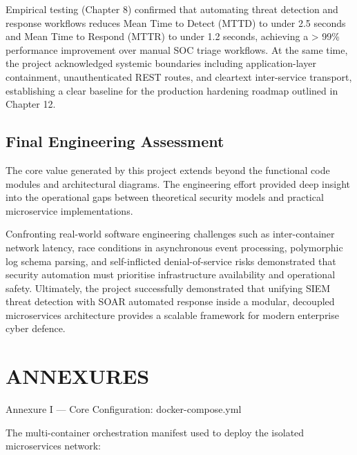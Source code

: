 Empirical testing (Chapter 8) confirmed that automating threat detection and response workflows reduces Mean Time to Detect (MTTD) to under 2.5 seconds and Mean Time to Respond (MTTR) to under 1.2 seconds, achieving a > 99\% performance improvement over manual SOC triage workflows. At the same time, the project acknowledged systemic boundaries including application-layer containment, unauthenticated REST routes, and cleartext inter-service transport, establishing a clear baseline for the production hardening roadmap outlined in Chapter 12.

\section{Final Engineering Assessment}

The core value generated by this project extends beyond the functional code modules and architectural diagrams. The engineering effort provided deep insight into the operational gaps between theoretical security models and practical microservice implementations.

Confronting real-world software engineering challenges such as inter-container network latency, race conditions in asynchronous event processing, polymorphic log schema parsing, and self-inflicted denial-of-service risks demonstrated that security automation must prioritise infrastructure availability and operational safety. Ultimately, the project successfully demonstrated that unifying SIEM threat detection with SOAR automated response inside a modular, decoupled microservices architecture provides a scalable framework for modern enterprise cyber defence.

\newpage
\chapter*{ANNEXURES}

Annexure I — Core Configuration: docker-compose.yml

The multi-container orchestration manifest used to deploy the isolated microservices network:

